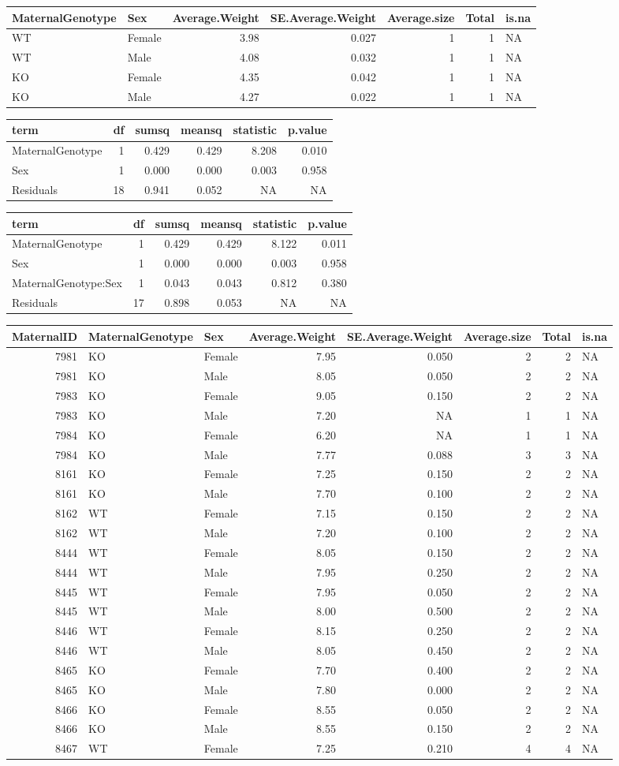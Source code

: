 \documentclass[]{article}
\begin{document}
\begin{longtable}[]{@{}llrrrrl@{}}
\toprule
MaternalGenotype & Sex & Average.Weight & SE.Average.Weight &
Average.size & Total & is.na\tabularnewline
\midrule
\endhead
WT & Female & 3.98 & 0.027 & 1 & 1 & NA\tabularnewline
WT & Male & 4.08 & 0.032 & 1 & 1 & NA\tabularnewline
KO & Female & 4.35 & 0.042 & 1 & 1 & NA\tabularnewline
KO & Male & 4.27 & 0.022 & 1 & 1 & NA\tabularnewline
\bottomrule
\end{longtable}

\begin{longtable}[]{@{}lrrrrr@{}}
\toprule
term & df & sumsq & meansq & statistic & p.value\tabularnewline
\midrule
\endhead
MaternalGenotype & 1 & 0.429 & 0.429 & 8.208 & 0.010\tabularnewline
Sex & 1 & 0.000 & 0.000 & 0.003 & 0.958\tabularnewline
Residuals & 18 & 0.941 & 0.052 & NA & NA\tabularnewline
\bottomrule
\end{longtable}

\begin{longtable}[]{@{}lrrrrr@{}}
\toprule
term & df & sumsq & meansq & statistic & p.value\tabularnewline
\midrule
\endhead
MaternalGenotype & 1 & 0.429 & 0.429 & 8.122 & 0.011\tabularnewline
Sex & 1 & 0.000 & 0.000 & 0.003 & 0.958\tabularnewline
MaternalGenotype:Sex & 1 & 0.043 & 0.043 & 0.812 & 0.380\tabularnewline
Residuals & 17 & 0.898 & 0.053 & NA & NA\tabularnewline
\bottomrule
\end{longtable}

\begin{longtable}[]{@{}rllrrrrl@{}}
\toprule
MaternalID & MaternalGenotype & Sex & Average.Weight & SE.Average.Weight
& Average.size & Total & is.na\tabularnewline
\midrule
\endhead
7981 & KO & Female & 7.95 & 0.050 & 2 & 2 & NA\tabularnewline
7981 & KO & Male & 8.05 & 0.050 & 2 & 2 & NA\tabularnewline
7983 & KO & Female & 9.05 & 0.150 & 2 & 2 & NA\tabularnewline
7983 & KO & Male & 7.20 & NA & 1 & 1 & NA\tabularnewline
7984 & KO & Female & 6.20 & NA & 1 & 1 & NA\tabularnewline
7984 & KO & Male & 7.77 & 0.088 & 3 & 3 & NA\tabularnewline
8161 & KO & Female & 7.25 & 0.150 & 2 & 2 & NA\tabularnewline
8161 & KO & Male & 7.70 & 0.100 & 2 & 2 & NA\tabularnewline
8162 & WT & Female & 7.15 & 0.150 & 2 & 2 & NA\tabularnewline
8162 & WT & Male & 7.20 & 0.100 & 2 & 2 & NA\tabularnewline
8444 & WT & Female & 8.05 & 0.150 & 2 & 2 & NA\tabularnewline
8444 & WT & Male & 7.95 & 0.250 & 2 & 2 & NA\tabularnewline
8445 & WT & Female & 7.95 & 0.050 & 2 & 2 & NA\tabularnewline
8445 & WT & Male & 8.00 & 0.500 & 2 & 2 & NA\tabularnewline
8446 & WT & Female & 8.15 & 0.250 & 2 & 2 & NA\tabularnewline
8446 & WT & Male & 8.05 & 0.450 & 2 & 2 & NA\tabularnewline
8465 & KO & Female & 7.70 & 0.400 & 2 & 2 & NA\tabularnewline
8465 & KO & Male & 7.80 & 0.000 & 2 & 2 & NA\tabularnewline
8466 & KO & Female & 8.55 & 0.050 & 2 & 2 & NA\tabularnewline
8466 & KO & Male & 8.55 & 0.150 & 2 & 2 & NA\tabularnewline
8467 & WT & Female & 7.25 & 0.210 & 4 & 4 & NA\tabularnewline
\bottomrule
\end{longtable}
\end{document}

